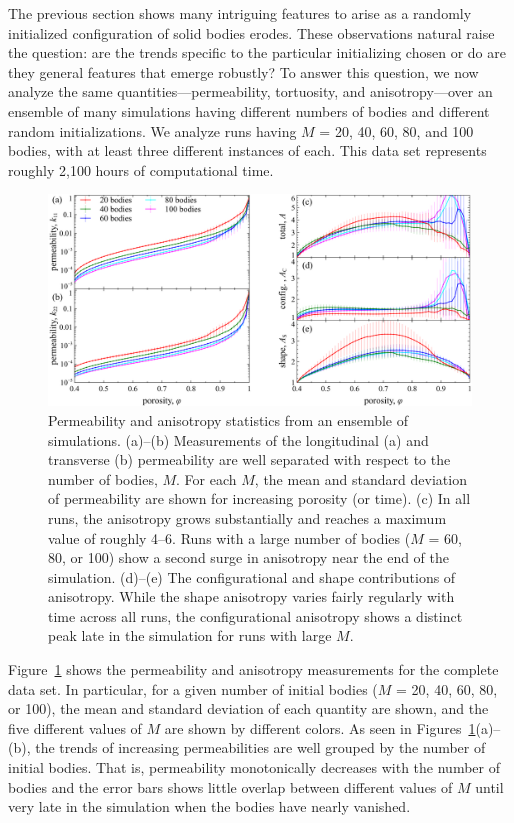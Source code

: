 \documentclass[3p]{elsarticle}
\begin{document}
The previous section shows many intriguing features to arise as a randomly initialized configuration of solid bodies erodes. These observations natural raise the question: are the trends specific to the particular initializing chosen or do are they general features that emerge robustly? To answer this question, we now analyze the same quantities---permeability, tortuosity, and anisotropy---over an ensemble of many simulations having different numbers of bodies and different random initializations. We analyze runs having $M$ = 20, 40, 60, 80, and 100 bodies, with at least three different instances of each. This data set represents roughly 2,100 hours of computational time.  

\begin{figure}%
\centering
\includegraphics[width = 0.9 \textwidth]{./figs/fig5.pdf}
\caption{Permeability and anisotropy statistics from an ensemble of simulations. (a)--(b) Measurements of the longitudinal (a) and transverse (b) permeability are well separated with respect to the number of bodies, $M$. For each $M$, the mean and standard deviation of permeability are shown for increasing porosity (or time). (c) In all runs, the anisotropy grows substantially and reaches a maximum value of roughly 4--6. Runs with a large number of bodies ($M$ = 60, 80, or 100) show a second surge in anisotropy near the end of the simulation. (d)--(e) The configurational and shape contributions of anisotropy. While the shape anisotropy varies fairly regularly with time across all runs, the configurational anisotropy shows a distinct peak late in the simulation for runs with large $M$.
\label{fig5}
}
\end{figure}

Figure~\ref{fig5} shows the permeability and anisotropy measurements for the complete data set. In particular, for a given number of initial bodies ($M$ = 20, 40, 60, 80, or 100), the mean and standard deviation of each quantity are shown, and the five different values of $M$ are shown by different colors. As seen in Figures~\ref{fig5}(a)--(b), the trends of increasing permeabilities are well grouped by the number of initial bodies. That is, permeability monotonically decreases with the number of bodies and the error bars shows little overlap between different values of $M$ until very late in the simulation when the bodies have nearly vanished. 
\end{document}
